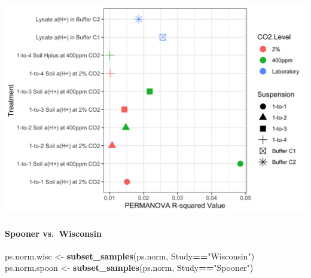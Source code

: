 \documentclass[]{article}
\newenvironment{Shaded}{\begin{snugshade}}{\end{snugshade}}
\newcommand{\KeywordTok}[1]{\textcolor[rgb]{0.13,0.29,0.53}{\textbf{#1}}}
\newcommand{\NormalTok}[1]{#1}
\newcommand{\OperatorTok}[1]{\textcolor[rgb]{0.81,0.36,0.00}{\textbf{#1}}}
\newcommand{\StringTok}[1]{\textcolor[rgb]{0.31,0.60,0.02}{#1}}
\let\oldparagraph\paragraph
\renewcommand{\paragraph}[1]{\oldparagraph{#1}\mbox{}}
\begin{document}
\includegraphics{output-rmd/rsq-permanova-plot-hplus-1.png}

\hypertarget{spooner-vs.wisconsin}{%
\paragraph{Spooner vs.~Wisconsin}\label{spooner-vs.wisconsin}}

\begin{Shaded}
\begin{Highlighting}[]
\NormalTok{ps.norm.wisc <-}\StringTok{ }\KeywordTok{subset_samples}\NormalTok{(ps.norm, Study}\OperatorTok{==}\StringTok{"Wisconsin"}\NormalTok{)}
\NormalTok{ps.norm.spoon <-}\StringTok{ }\KeywordTok{subset_samples}\NormalTok{(ps.norm, Study}\OperatorTok{==}\StringTok{"Spooner"}\NormalTok{)}
\end{Highlighting}
\end{Shaded}
\end{document}
